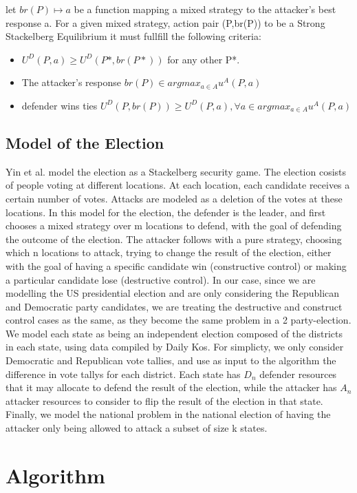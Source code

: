 \documentclass[letterpaper]{article} %
\begin{document}
let $br(P) \mapsto a$ be a function mapping a mixed strategy to the attacker's best response a. For a given mixed strategy, action pair (P,br(P)) to be a Strong Stackelberg Equilibrium it must fullfill the following criteria: 

\begin{itemize}
\item $U^D(P,a) \geq U^D(P*,br(P*))$ for any other P*.
\item The attacker's response $br(P) \in argmax_{a \in A}u^A(P,a)$
\item defender wins ties $U^D(P,br(P)) \geq U^D(P,a), \forall a \in argmax_{a \in A}u^A(P,a)$
\end{itemize}

\subsection{Model of the Election}
Yin et al. model the election as a Stackelberg security game. The election cosists of people voting at different locations. At each location, each candidate receives a certain number of votes. Attacks are modeled as a deletion of the votes at these locations. In this model for the election, the defender is the leader, and first chooses a mixed strategy over m locations to defend, with the goal of defending the outcome of the election. The attacker follows with a pure strategy, choosing which n locations to attack, trying to change the result of the election, either with the goal of having a specific candidate win (constructive control) or making a particular candidate lose (destructive control). In our case, since we are modelling the US presidential election and are only considering the Republican and Democratic party candidates, we are treating the destructive and construct control cases as the same, as they become the same problem in a 2 party-election. We model each state as being an independent election composed of the districts in each state, using data compiled by Daily Kos. For simplicty, we only consider Democratic and Republican vote tallies, and use as input to the algorithm the difference in vote tallys for each district. Each state has $D_n$ defender resources that it may allocate to defend the result of the election, while the attacker has $A_n$ attacker resources to consider to flip the result of the election in that state. Finally, we model the national problem in the national election of having the attacker only being allowed to attack a subset of size k states. 
\section{Algorithm}
\end{document}
